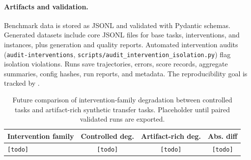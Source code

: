 \paragraph{Artifacts and validation.}
Benchmark data is stored as JSONL and validated with Pydantic schemas. Generated datasets include core JSONL files for base tasks, interventions, and instances, plus generation and quality reports. Automated intervention audits (\texttt{audit-interventions}, \texttt{scripts/audit\_intervention\_isolation.py}) flag isolation violations. Runs save trajectories, errors, score records, aggregate summaries, config hashes, run reports, and metadata. The reproducibility goal is tracked by .



\begin{table}[t]
\centering
\caption{Future comparison of intervention-family degradation between controlled tasks and artifact-rich synthetic transfer tasks. Placeholder until paired validated runs are exported.}
\label{tab:mini-study-family-comparison}
\begin{tabular}{lccc}
\toprule
Intervention family & Controlled deg. & Artifact-rich deg. & Abs. diff \\
\midrule
\texttt{[todo]} & \texttt{[todo]} & \texttt{[todo]} & \texttt{[todo]} \\
\bottomrule
\end{tabular}
\end{table}
